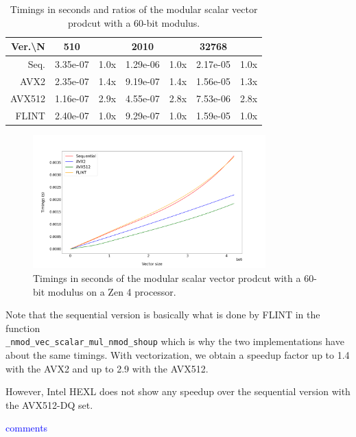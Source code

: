 \documentclass[a4paper]{article}
\begin{document}
\begin{table}[h!]
\begin{tabular}{|r|*{3}{c c|}}
        \hline
        \rowcolor{myGray}
        Ver.\textbackslash N & 510 & & 2010 & & 32768 & \\
        \hline
        \cellcolor{myGray} Seq. & 3.35e-07 & 1.0x & 1.29e-06 & 1.0x & 2.17e-05 & 1.0x \\
        \hline
        \cellcolor{myGray} AVX2 & 2.35e-07 & 1.4x & 9.19e-07 & 1.4x & 1.56e-05 & 1.3x \\
        \hline
        \cellcolor{myGray} AVX512 & 1.16e-07 & 2.9x & 4.55e-07 & 2.8x & 7.53e-06 & 2.8x \\
        \hline
        \cellcolor{myGray} FLINT & 2.40e-07 & 1.0x & 9.29e-07 & 1.0x & 1.59e-05 & 1.0x \\
        \hline
    \end{tabular}
    \caption{Timings in seconds and ratios of the modular scalar vector prodcut with a 60-bit modulus.}
\end{table}

\begin{figure}[h!]
    \begin{center}
        \includegraphics[width=0.8\textwidth]{scalar-vector-mod_argiope.png}
    \end{center}
    \caption{Timings in seconds of the modular scalar vector prodcut with a 60-bit modulus on a Zen 4 processor.}
\end{figure}

\newpage
Note that the sequential version is basically what is done by FLINT in the function \\
\texttt{\_nmod\_vec\_scalar\_mul\_nmod\_shoup} which is why the two implementations have about the same timings.
With vectorization, we obtain a speedup factor up to 1.4 with the AVX2 and up to 2.9 with the AVX512.

However, Intel HEXL does not show any speedup over the sequential version with the AVX512-DQ set.  

\textcolor{blue}{comments}
\end{document}
